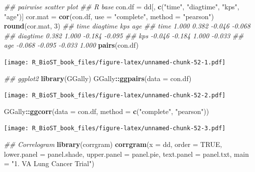 \documentclass[
]{book}
\newenvironment{Shaded}{\begin{snugshade}}{\end{snugshade}}
\newcommand{\CommentTok}[1]{\textcolor[rgb]{0.56,0.35,0.01}{\textit{#1}}}
\newcommand{\DataTypeTok}[1]{\textcolor[rgb]{0.13,0.29,0.53}{#1}}
\newcommand{\DecValTok}[1]{\textcolor[rgb]{0.00,0.00,0.81}{#1}}
\newcommand{\KeywordTok}[1]{\textcolor[rgb]{0.13,0.29,0.53}{\textbf{#1}}}
\newcommand{\NormalTok}[1]{#1}
\newcommand{\OperatorTok}[1]{\textcolor[rgb]{0.81,0.36,0.00}{\textbf{#1}}}
\newcommand{\OtherTok}[1]{\textcolor[rgb]{0.56,0.35,0.01}{#1}}
\newcommand{\StringTok}[1]{\textcolor[rgb]{0.31,0.60,0.02}{#1}}
\begin{document}
\begin{Shaded}
\begin{Highlighting}[]
\CommentTok{\#\# pairwise scatter plot}
\CommentTok{\#\# R base}
\NormalTok{con.df =}\StringTok{ }\NormalTok{dd[, }\KeywordTok{c}\NormalTok{(}\StringTok{"time"}\NormalTok{, }\StringTok{"diagtime"}\NormalTok{, }\StringTok{"kps"}\NormalTok{, }\StringTok{"age"}\NormalTok{)]}
\NormalTok{cor.mat =}\StringTok{ }\KeywordTok{cor}\NormalTok{(con.df, }\DataTypeTok{use =} \StringTok{"complete"}\NormalTok{, }\DataTypeTok{method =} \StringTok{"pearson"}\NormalTok{)}
\KeywordTok{round}\NormalTok{(cor.mat, }\DecValTok{3}\NormalTok{)}
\CommentTok{\#\#            time diagtime    kps    age}
\CommentTok{\#\# time      1.000    0.382 {-}0.046 {-}0.068}
\CommentTok{\#\# diagtime  0.382    1.000 {-}0.184 {-}0.095}
\CommentTok{\#\# kps      {-}0.046   {-}0.184  1.000 {-}0.033}
\CommentTok{\#\# age      {-}0.068   {-}0.095 {-}0.033  1.000}
\KeywordTok{pairs}\NormalTok{(con.df)}
\end{Highlighting}
\end{Shaded}

\texttt{[image: R\_BioST\_book\_files/figure-latex/unnamed-chunk-52-1.pdf]}

\begin{Shaded}
\begin{Highlighting}[]
\CommentTok{\#\# ggplot2}
\KeywordTok{library}\NormalTok{(GGally)}
\NormalTok{GGally}\OperatorTok{::}\KeywordTok{ggpairs}\NormalTok{(}\DataTypeTok{data =}\NormalTok{ con.df)}
\end{Highlighting}
\end{Shaded}

\texttt{[image: R\_BioST\_book\_files/figure-latex/unnamed-chunk-52-2.pdf]}

\begin{Shaded}
\begin{Highlighting}[]
\NormalTok{GGally}\OperatorTok{::}\KeywordTok{ggcorr}\NormalTok{(}\DataTypeTok{data =}\NormalTok{ con.df, }
               \DataTypeTok{method =} \KeywordTok{c}\NormalTok{(}\StringTok{"complete"}\NormalTok{, }\StringTok{"pearson"}\NormalTok{))}
\end{Highlighting}
\end{Shaded}

\texttt{[image: R\_BioST\_book\_files/figure-latex/unnamed-chunk-52-3.pdf]}

\begin{Shaded}
\begin{Highlighting}[]
\CommentTok{\#\# Correlogram}
\KeywordTok{library}\NormalTok{(corrgram)}
\KeywordTok{corrgram}\NormalTok{(}\DataTypeTok{x =}\NormalTok{ dd, }
         \DataTypeTok{order =} \OtherTok{TRUE}\NormalTok{, }
         \DataTypeTok{lower.panel =}\NormalTok{ panel.shade, }
         \DataTypeTok{upper.panel =}\NormalTok{ panel.pie, }
         \DataTypeTok{text.panel =}\NormalTok{ panel.txt, }
         \DataTypeTok{main =} \StringTok{"1. VA Lung Cancer Trial"}\NormalTok{)}
\end{Highlighting}
\end{Shaded}
\end{document}
